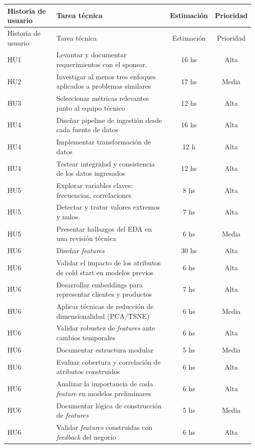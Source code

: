 \documentclass[
11pt, %
]{charter}
\begin{document}
\begin{longtable}{|p{2cm}|p{10cm}|c|c|}
\hline
\rowcolor[HTML]{C0C0C0}
Historia de usuario & Tarea técnica & Estimación & Prioridad \\ \hline
\endfirsthead

\hline
\rowcolor[HTML]{C0C0C0}
Historia de usuario & Tarea técnica & Estimación & Prioridad \\ \hline
\endhead

HU1 & Levantar y documentar requerimientos con el sponsor. & 16 hs & Alta \\ \hline

HU2 & Investigar al menos tres enfoques aplicados a problemas similares & 17 hs & Media \\ \hline

HU3 & Seleccionar métricas relevantes junto al equipo técnico & 12 hs & Alta \\ \hline

HU4 & Diseñar pipeline de ingestión desde cada fuente de datos & 16 hs & Alta \\ \hline
HU4 & Implementar transformación de datos  & 12 h & Alta \\ \hline
HU4 & Testear integridad y consistencia de los datos ingresados & 12 hs & Alta \\ \hline

HU5 & Explorar variables claves: frecuencias, correlaciones & 8 hs & Alta \\ \hline
HU5 & Detectar y tratar valores extremos y nulos & 7 hs & Alta \\ \hline
HU5 & Presentar hallazgos del EDA en una revisión técnica & 6 hs & Media \\ \hline

HU6 & Diseñar \textit{features} & 30 hs & Alta \\ \hline
HU6 & Validar el impacto de los atributos de cold start en modelos previos & 6 hs & Alta \\ \hline
HU6 & Desarrollar embeddings para representar clientes y productos & 7 hs & Alta \\ \hline
HU6 & Aplicar técnicas de reducción de dimensionalidad (PCA/TSNE) & 6 hs & Media \\ \hline
HU6 & Validar robustez de \textit{features} ante cambios temporales & 6 hs & Alta \\ \hline
HU6 & Documentar estructura modular & 5 hs & Media \\ \hline
HU6 & Evaluar cobertura y correlación de atributos construidos & 6 hs & Alta \\ \hline
HU6 & Analizar la importancia de cada \textit{feature} en modelos preliminares & 6 hs & Alta \\ \hline
HU6 & Documentar lógica de construcción de \textit{features} & 5 hs & Media \\ \hline
HU6 & Validar \textit{features} construidas con \textit{feedback} del negocio & 6 hs & Alta \\ \hline


\end{longtable}
\end{document}
